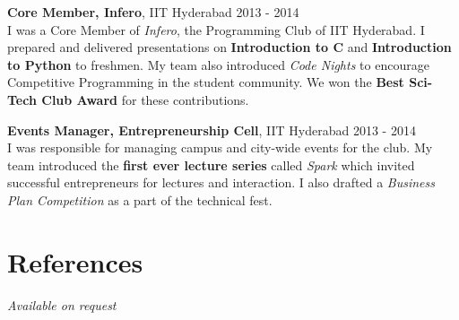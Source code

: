 \documentclass[margin,line]{res}
\begin{document}
\begin{resume}
  \vspace*{-2mm}
  {\bf Core Member, Infero}, IIT Hyderabad \hfill 2013 - 2014 \\
  	I was a Core Member of {\it Infero}, the Programming Club of IIT Hyderabad. I prepared and delivered presentations on {\bf Introduction to C} and {\bf Introduction to Python} to freshmen. My team also introduced {\it Code Nights} to encourage Competitive Programming in the student community. We won the {\bf Best Sci-Tech Club Award} for these contributions.

  \vspace*{-2mm}
  {\bf Events Manager, Entrepreneurship Cell}, IIT Hyderabad \hfill 2013 - 2014 \\
    I was responsible for managing campus and city-wide events for the club. My team introduced the {\bf first ever lecture series} called {\it Spark} which invited successful entrepreneurs for lectures and interaction. I also drafted a {\it Business Plan Competition} as a part of the technical fest.

\section{\sc References}
  {\it Available on request}


\end{resume}
\end{document}

